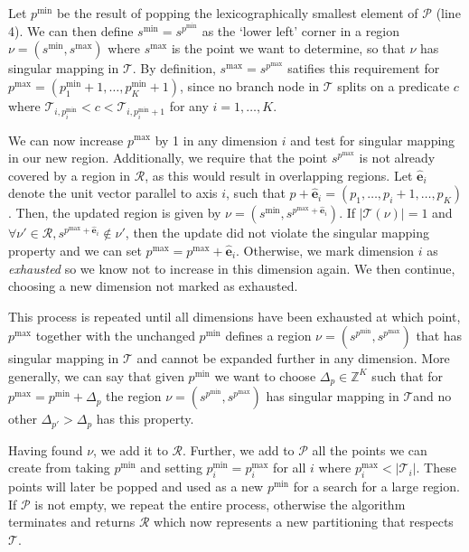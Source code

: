 Let $p^{\min}$ be the result of popping the lexicographically smallest element
of $\mathcal{P}$ (line 4). We can then define $s^{\min} = s^{p^{\min}}$ as the `lower
left' corner in a region $\nu = (s^{\min}, s^{\max})$ where $s^{\max}$ is the
point we want to determine, so that $\nu$ has singular mapping in $\mathcal{T}$.
By definition, $s^{\max} = s^{p^{\max}}$ satifies this requirement for $p^{\max}
= (p^{\min}_{1} + 1, \ldots, p^{\min}_{K} + 1)$, since no branch node in
$\mathcal{T}$ splits on a predicate $c$ where $\mathcal{T}_{i,p^{\min}_{i}} < c
< \mathcal{T}_{i,p^{\min}_{i} + 1}$ for any $i = 1, \ldots, K$. 

We can now increase $p^{\max}$ by 1 in any dimension $i$ and test for singular
mapping in our new region. Additionally, we require that the point
$s^{p^{\max}}$ is not already covered by a region in $\mathcal{R}$, as this
would result in overlapping regions. Let $\mathbf{\hat{e}}_i$ denote the unit
vector parallel to axis $i$, such that $p + \mathbf{\hat{e}}_i = (p_1,\ldots,p_i
+ 1,\ldots,p_K)$. Then, the updated region is given by $\nu = (s^{\min},
s^{p^{\max} + \mathbf{\hat{e}}_{i}})$. If $|\mathcal{T}(\nu)| = 1$ and $\forall
\nu' \in \mathcal{R}, s^{p^{\max} + \mathbf{\hat{e}}_{i}} \notin \nu'$, then the
update did not violate the singular mapping property and we can set $p^{\max} =
p^{\max} + \mathbf{\hat{e}}_{i}$. Otherwise, we mark dimension $i$ as
\textit{exhausted} so we know not to increase in this dimension again. We then
continue, choosing a new dimension not marked as exhausted.

This process is repeated until all dimensions have been exhausted at which
point, $p^{\max}$ together with the unchanged $p^{\min}$ defines a region $\nu =
(s^{p^{\min}}, s^{p^{\max}})$ that has singular mapping in $\mathcal{T}$ and
cannot be expanded further in any dimension. More generally, we can say that
given $p^{\min}$ we want to choose $\Delta_{p} \in \mathbb{Z}^{K}$ such that for
$p^{\max} = p^{\min} + \Delta_{p}$ the region $\nu = (s^{p^{\min}},
s^{p^{\max}})$ has singular mapping in $\mathcal{T} $and no other $\Delta_{p'} >
\Delta_{p}$ has this property.

Having found $\nu$, we add it to $\mathcal{R}$. Further, we add to $\mathcal{P}$
all the points we can create from taking $p^{\min}$ and setting $p^{\min}_{i} =
p^{\max}_{i}$ for all $i$ where $p^{\max}_{i} < |\mathcal{T}_{i}|$. These points
will later be popped and used as a new $p^{\min}$ for a search for a large
region. If $\mathcal{P}$ is not empty, we repeat the entire process, otherwise
the algorithm terminates and returns $\mathcal{R}$ which now represents a new
partitioning that respects $\mathcal{T}$.


